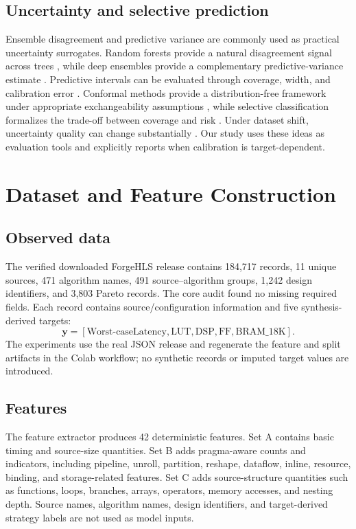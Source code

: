 \documentclass[conference]{IEEEtran}
\begin{document}
\subsection{Uncertainty and selective prediction}
Ensemble disagreement and predictive variance are commonly used as practical uncertainty surrogates. Random forests provide a natural disagreement signal across trees \cite{breiman2001random}, while deep ensembles provide a complementary predictive-variance estimate \cite{lakshminarayanan2017simple}. Predictive intervals can be evaluated through coverage, width, and calibration error \cite{guo2017calibration,kuleshov2018accurate}. Conformal methods provide a distribution-free framework under appropriate exchangeability assumptions \cite{vovk2005algorithmic,angelopoulos2023conformal,romano2019conformalized}, while selective classification formalizes the trade-off between coverage and risk \cite{geifman2017selective}. Under dataset shift, uncertainty quality can change substantially \cite{ovadia2019can}. Our study uses these ideas as evaluation tools and explicitly reports when calibration is target-dependent.

\section{Dataset and Feature Construction}
\subsection{Observed data}
The verified downloaded ForgeHLS release contains 184,717 records, 11 unique sources, 471 algorithm names, 491 source--algorithm groups, 1,242 design identifiers, and 3,803 Pareto records. The core audit found no missing required fields. Each record contains source/configuration information and five synthesis-derived targets:
\[
\mathbf{y}=[\text{Worst-caseLatency},\text{LUT},\text{DSP},\text{FF},\text{BRAM\_18K}].
\]
The experiments use the real JSON release and regenerate the feature and split artifacts in the Colab workflow; no synthetic records or imputed target values are introduced.

\subsection{Features}
The feature extractor produces 42 deterministic features. Set A contains basic timing and source-size quantities. Set B adds pragma-aware counts and indicators, including pipeline, unroll, partition, reshape, dataflow, inline, resource, binding, and storage-related features. Set C adds source-structure quantities such as functions, loops, branches, arrays, operators, memory accesses, and nesting depth. Source names, algorithm names, design identifiers, and target-derived strategy labels are not used as model inputs.
\end{document}
